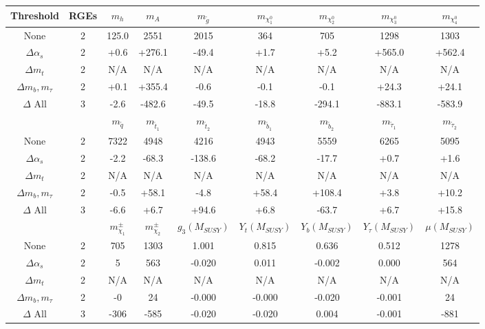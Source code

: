 \begin{table}
\begin{center}
\begin{tabular}{|c|c|ccccccc|}\hline
Threshold & RGEs \vphantom{\bigg[} & $m_h$   & $m_A$   & $m_{\tilde g}$   & $m_{\chi_1^0}$   & $m_{\chi_2^0}$   & $m_{\chi_3^0}$   & $m_{\chi_4^0}$   \\ \hline
None               & 2 & 125.0 & 2551 & 2015 &  364 &  705 & 1298 &1303\\
$\Delta \alpha_s$  & 2 &  +0.6 & +276.1 & -49.4 &  +1.7 &  +5.2 & +565.0 &+562.4\\
$\Delta m_t$      & 2 & N/A & N/A & N/A & N/A & N/A & N/A & N/A  \\
$\Delta m_b, m_\tau$& 2 &  +0.1 & +355.4 &  -0.6 &  -0.1 &  -0.1 & +24.3 &+24.1\\
$\Delta$ All      & 3 &  -2.6 & -482.6 & -49.5 & -18.8 & -294.1 & -883.1 &-583.9\\

%
\hline & \vphantom{\bigg[}  & $m_{{\tilde q}}$  & $m_{{\tilde t}_1}$  & $m_{{\tilde t}_2}$  & $m_{{\tilde b}_1}$  & $m_{{\tilde b}_2}$  & $m_{{\tilde \tau}_1}$  & $m_{{\tilde \tau}_2}$ \\ \hline
None             & 2 &7322 & 4948 & 4216 & 4943 & 5559 & 6265 &5095\\
$\Delta \alpha_s$  & 2 &  -2.2 & -68.3 & -138.6 & -68.2 & -17.7 &  +0.7 & +1.6\\
$\Delta m_t$      & 2 & N/A & N/A & N/A & N/A & N/A & N/A & N/A \\
$\Delta m_b, m_\tau$& 2 &  -0.5 & +58.1 &  -4.8 & +58.4 & +108.4 &  +3.8 &+10.2\\
$\Delta$ All      & 3 &  -6.6 &  +6.7 & +94.6 &  +6.8 & -63.7 &  +6.7 &+15.8\\

%
\hline & \vphantom{\bigg[}  & $m_{\chi_1}^\pm$  & $m_{\chi_2}^\pm$  & $g_3(M_{SUSY})$  & $Y_t(M_{SUSY})$  & $Y_b(M_{SUSY})$  & $Y_\tau(M_{SUSY})$  & $\mu(M_{SUSY})$     \\ \hline
 None                   & 2 &  705 & 1303 & 1.001 & 0.815 & 0.636 & 0.512 & 1278\\
$\Delta \alpha_s$  & 2 &    5 &  563 & -0.020 & 0.011 & -0.002 & 0.000 &  564\\
$\Delta m_t$      & 2 & N/A & N/A & N/A & N/A & N/A & N/A& N/A\\
$\Delta m_b, m_\tau$& 2 &   -0 &   24 & -0.000 & -0.000 & -0.020 & -0.001 &   24\\
$\Delta$ All      & 3 & -306 & -585 & -0.020 & -0.020 & 0.004 & -0.001 & -881\\


\end{tabular}
\end{center}
\end{table}
